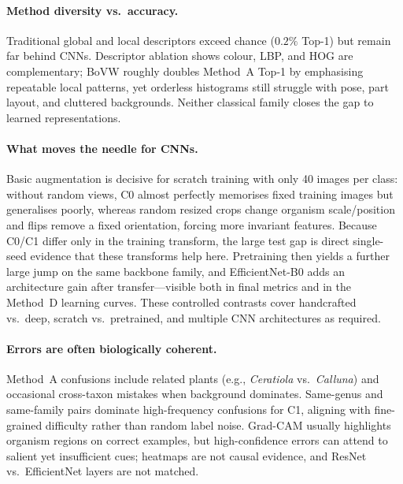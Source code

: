 \documentclass[10pt,twocolumn,letterpaper]{article}
\begin{document}
\paragraph{Method diversity vs.\ accuracy.}
Traditional global and local descriptors exceed chance ($0.2\%$ Top-1) but
remain far behind CNNs. Descriptor ablation shows colour, LBP, and HOG are
complementary; BoVW roughly doubles Method~A Top-1 by emphasising repeatable
local patterns, yet orderless histograms still struggle with pose, part layout,
and cluttered backgrounds. Neither classical family closes the gap to learned
representations.

\paragraph{What moves the needle for CNNs.}
Basic augmentation is decisive for scratch training with only 40 images per
class: without random views, C0 almost perfectly memorises fixed training
images but generalises poorly, whereas random resized crops change organism
scale/position and flips remove a fixed orientation, forcing more invariant
features. Because C0/C1 differ only in the training transform, the large test
gap is direct single-seed evidence that these transforms help here. Pretraining
then yields a further large jump on the same backbone family, and
EfficientNet-B0 adds an architecture gain after transfer---visible both in
final metrics and in the Method~D learning curves. These controlled contrasts
cover handcrafted vs.\ deep, scratch vs.\ pretrained, and multiple CNN
architectures as required.

\paragraph{Errors are often biologically coherent.}
Method~A confusions include related plants (e.g., \emph{Ceratiola} vs.\
\emph{Calluna}) and occasional cross-taxon mistakes when background dominates.
Same-genus and same-family pairs dominate high-frequency confusions for C1,
aligning with fine-grained difficulty rather than random label noise.
Grad-CAM usually highlights organism regions on correct examples, but
high-confidence errors can attend to salient yet insufficient cues; heatmaps
are not causal evidence, and ResNet vs.\ EfficientNet layers are not matched.
\end{document}
